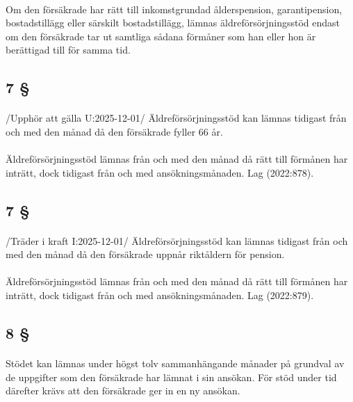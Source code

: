 \documentclass[a4paper,notitlepage,openany,10pt]{book}
\begin{document}
\paragraph*{}
Om den försäkrade har rätt till inkomstgrundad ålderspension, garantipension, bostadstillägg eller särskilt bostadstillägg, lämnas äldreförsörjningsstöd endast om den försäkrade tar ut samtliga sådana förmåner som han eller hon är berättigad till för samma tid.
\subsection*{7 §}
\paragraph*{}
/Upphör att gälla U:2025-12-01/
Äldreförsörjningsstöd kan lämnas tidigast från och med den månad då den försäkrade fyller 66 år.
\paragraph*{}
Äldreförsörjningsstöd lämnas från och med den månad då rätt till förmånen har inträtt, dock tidigast från och med ansökningsmånaden.
Lag (2022:878).
\subsection*{7 §}
\paragraph*{}
/Träder i kraft I:2025-12-01/
Äldreförsörjningsstöd kan lämnas tidigast från och med den månad då den försäkrade uppnår riktåldern för pension.
\paragraph*{}
Äldreförsörjningsstöd lämnas från och med den månad då rätt till förmånen har inträtt, dock tidigast från och med ansökningsmånaden.
Lag (2022:879).
\subsection*{8 §}
\paragraph*{}
Stödet kan lämnas under högst tolv sammanhängande månader på grundval av de uppgifter som den försäkrade har lämnat i sin ansökan. För stöd under tid därefter krävs att den försäkrade ger in en ny ansökan.
\end{document}
